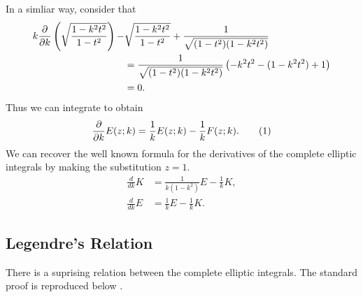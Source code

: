 In a simliar way, consider that
\begin{align*}
k\frac{\partial }{\partial k}\left(\sqrt{\frac{1-k^2t^2}{1-t^2}}\right) -& \sqrt{\frac{1-k^2t^2}{1-t^2}} + \frac{1}{\sqrt{(1-t^2)(1-k^2 t^2)}} \\
&= \frac{1}{\sqrt{(1-t^2)(1-k^2 t^2)}}\left(-k^2t^2 - (1-k^2t^2) + 1\right) \\
&= 0.
\end{align*}
Thus we can integrate to obtain
\[
\Partial{}{k}E(z;k) = \frac{1}{k}E(z;k) - \frac{1}{k}F(z;k). \labelthis{eqn:dtildeEdk}
\]
We can recover the well known formula for the derivatives of the complete elliptic integrals by making the substitution $z=1$.
\begin{align}
\frac{d}{dk}K &= \frac{1}{k(1-k^2)}E - \frac{1}{k}K, \label{eqn:dKdk}\\
\frac{d}{dk}E &= \frac{1}{k}E - \frac{1}{k} K. \label{eqn:dEdk}
\end{align}














\subsection{Legendre's Relation}
\label{sub:Legendre's Relation}
There is a suprising relation between the complete elliptic integrals. The standard proof is reproduced below .

